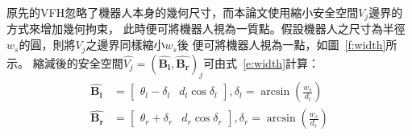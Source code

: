 原先的VFH忽略了機器人本身的幾何尺寸，而本論文使用縮小安全空間$V_j$邊界的方式來增加幾何拘束，
此時便可將機器人視為一質點。假設機器人之尺寸為半徑$w_s$的圓，則將$V_j$之邊界同樣縮小$w_s$後
便可將機器人視為一點，如圖~\ref{f:width}所示。
縮減後的安全空間$\hat{V_j} = (\hat{\mathbf{B_l}},\hat{\mathbf{B_r}})_j$可由式~\ref{e:width}計算：
\begin{align}
	\hat{\mathbf{B_l}}	&= \begin{bmatrix}
					\theta_l - \delta_l & d_l\cos\delta_l
				   \end{bmatrix},\delta_l = \arcsin({\frac{w_s}{d_l}}) \nonumber \\
	\hat{\mathbf{B_r}}	&= \begin{bmatrix}
					\theta_r + \delta_r & d_r\cos\delta_r
				   \end{bmatrix},\delta_r = \arcsin({\frac{w_s}{d_r}})
	\label{e:width}
\end{align}

